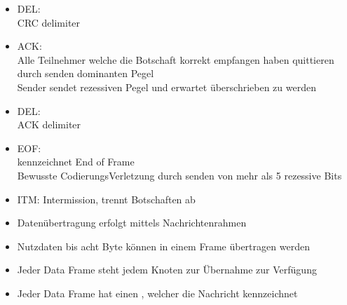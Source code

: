 \documentclass[letterpaper,10pt,english]{jupyterBook}
\begin{document}
\begin{itemize}
\item {} 
\sphinxAtStartPar
DEL:\\
CRC delimiter

\item {} 
\sphinxAtStartPar
ACK:\\
Alle Teilnehmer welche die Botschaft korrekt empfangen haben quittieren durch senden dominanten Pegel\\
Sender sendet rezessiven Pegel und erwartet überschrieben zu werden

\item {} 
\sphinxAtStartPar
DEL:\\
ACK delimiter

\item {} 
\sphinxAtStartPar
EOF:\\
kennzeichnet End of Frame\\
Bewusste Codierungs\sphinxhyphen{}Verletzung durch senden von mehr als 5 rezessive Bits

\item {} 
\sphinxAtStartPar
ITM:
Intermission, trennt Botschaften ab

\end{itemize}

\begin{DUlineblock}{0em}
\item[] 
\end{DUlineblock}
\begin{itemize}
\item {} 
\sphinxAtStartPar
Datenübertragung erfolgt mittels Nachrichtenrahmen 

\item {} 
\sphinxAtStartPar
Nutzdaten bis acht Byte können in einem Frame übertragen werden

\item {} 
\sphinxAtStartPar
Jeder Data Frame steht jedem Knoten zur Übernahme zur Verfügung

\item {} 
\sphinxAtStartPar
Jeder Data Frame hat einen , welcher die Nachricht kennzeichnet

\end{itemize}
\end{document}
